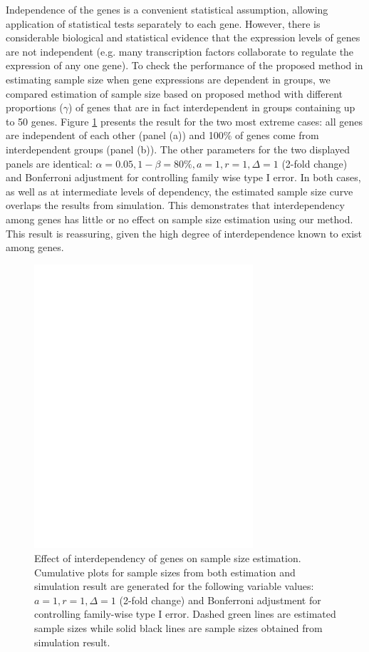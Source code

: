 \documentclass{bioinfo}
\begin{document}
Independence of the genes is a convenient statistical assumption,
allowing application of statistical tests separately to each
gene. However, there is considerable biological and statistical
evidence that the expression levels of genes are not independent
(e.g. many transcription factors collaborate to regulate the
expression of any one gene). To check the performance of the
proposed method in estimating sample size when gene expressions are
dependent in groups, we compared estimation of sample size based on
proposed method with different proportions ($\gamma$) of genes that
are in fact interdependent in groups containing up to 50
genes. Figure
\ref{fig:ResDep} presents the result for the two most extreme cases:
all genes are independent of each other (panel (a)) and 100\% of
genes come from interdependent groups (panel (b)). The other
parameters for the two displayed panels are identical: $\alpha =
0.05, 1 - \beta = 80\%, a = 1, r = 1, \Delta = 1$ (2-fold change)
and Bonferroni adjustment for controlling family wise type I
error. In both cases, as well as at intermediate levels of
dependency, the estimated sample size curve overlaps the results
from simulation.  This demonstrates that interdependency among genes
has little or no effect on sample size estimation using our
method. This result is reassuring, given the high degree of
interdependence known to exist among genes.

\begin{figure}[h]
  \centerline{\includegraphics*[width=3.2in]{ResDepF.pdf}} 
  \caption[Effect of interdependency of genes on sample size
    estimation] {Effect of interdependency of genes on sample size
    estimation.  Cumulative plots for sample sizes from both
    estimation and simulation result are generated for the following
    variable values: $a = 1, r = 1, \Delta = 1$ (2-fold change) and
    Bonferroni adjustment for controlling family-wise type I
    error. Dashed green lines are estimated sample sizes while solid
    black lines are sample sizes obtained from simulation result.}
  \label{fig:ResDep}
\end{figure}
\end{document}

